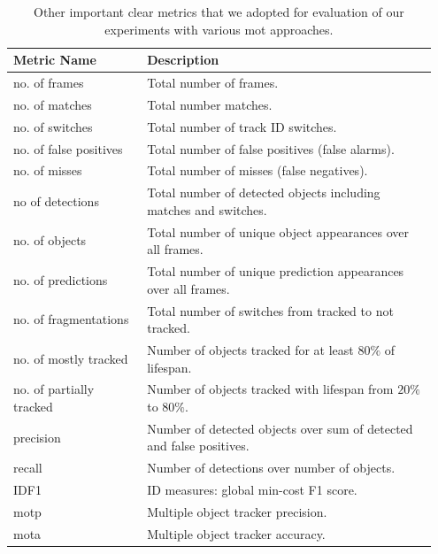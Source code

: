 \begin{table}[t]
    \centering
    \begin{tabular}{p{0.3\linewidth}p{0.65\linewidth}}
        \toprule
        \textbf{Metric Name}     & \textbf{Description}                                                 \\
        \midrule
        no. of frames            & Total number of frames.                                              \\
        no. of matches           & Total number matches.                                                \\
        no. of switches          & Total number of track ID switches.                                   \\
        no. of false positives   & Total number of false positives (false alarms).                      \\
        no. of misses            & Total number of misses (false negatives).                            \\
        no of detections         & Total number of detected objects including matches and switches.     \\
        no. of objects           & Total number of unique object appearances over all frames.           \\
        no. of predictions       & Total number of unique prediction appearances over all frames.       \\
        no. of fragmentations    & Total number of switches from tracked to not tracked.                \\
        no. of mostly tracked    & Number of objects tracked for at least $80\%$ of lifespan.           \\
        no. of partially tracked & Number of objects tracked with lifespan from $20\%$ to $80\%$.       \\
        precision                & Number of detected objects over sum of detected and false positives. \\
        recall                   & Number of detections over number of objects.                         \\
        IDF1                     & ID measures: global min-cost F1 score.                               \\
        \gls{motp}               & Multiple object tracker precision.                                   \\
        \gls{mota}               & Multiple object tracker accuracy.                                    \\
        \bottomrule
    \end{tabular}
    \caption[Other \gls{mot} metrics]{Other important \gls{clear} metrics that we adopted for evaluation of our experiments with various \gls{mot} approaches.}
    \label{tab:OtherCLEARMetrics}
\end{table}
